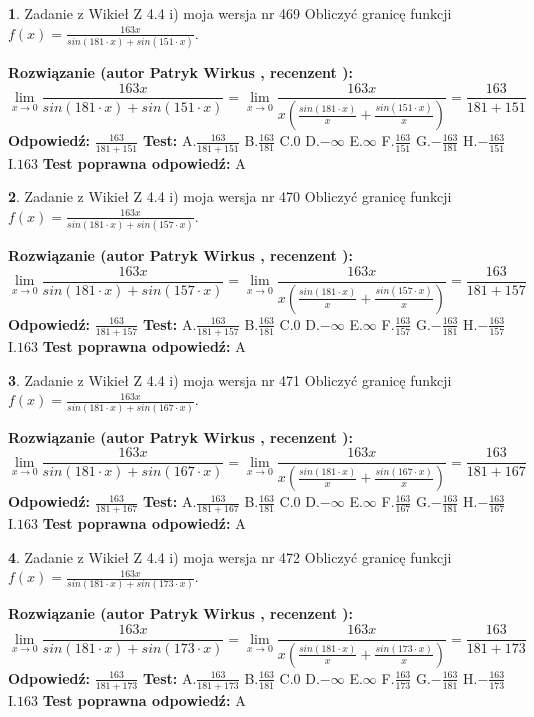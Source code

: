 \documentclass[12pt, a4paper]{article}
\theoremstyle{definition} %
\newtheorem{zad}{}
\newcommand{\zadStart}[1]{\begin{zad}#1\newline}
\newcommand{\zadStop}{\end{zad}}
\newcommand{\rozwStart}[2]{\noindent \textbf{Rozwiązanie (autor #1 , recenzent #2): }\newline}
\newcommand{\rozwStop}{\newline}
\newcommand{\odpStart}{\noindent \textbf{Odpowiedź:}\newline}
\newcommand{\odpStop}{\newline}
\newcommand{\testStart}{\noindent \textbf{Test:}\newline}
\newcommand{\testStop}{\newline}
\newcommand{\kluczStart}{\noindent \textbf{Test poprawna odpowiedź:}\newline}
\newcommand{\kluczStop}{\newline}
\begin{document}
\zadStart{Zadanie z Wikieł Z 4.4 i) moja wersja nr 469}
Obliczyć granicę funkcji $f(x)=\frac{163x}{sin(181\cdot x) +sin(151\cdot x)}$.
\zadStop
\rozwStart{Patryk Wirkus}{}
$$\lim\limits_{x\to 0}\frac{163x}{sin(181\cdot x) +sin(151\cdot x)}=\lim\limits_{x\to 0}\frac{163x}{x(\frac{sin(181\cdot x)}{x}+\frac{sin(151\cdot x)}{x})}=\frac{163}{181+151}$$
\rozwStop
\odpStart
$\frac{163}{181+151}$
\odpStop
\testStart
A.$\frac{163}{181+151}$
B.$\frac{163}{181}$
C.$0$
D.$-\infty$
E.$\infty$
F.$\frac{163}{151}$
G.$-\frac{163}{181}$
H.$-\frac{163}{151}$
I.$163$
\testStop
\kluczStart
A
\kluczStop



\zadStart{Zadanie z Wikieł Z 4.4 i) moja wersja nr 470}
Obliczyć granicę funkcji $f(x)=\frac{163x}{sin(181\cdot x) +sin(157\cdot x)}$.
\zadStop
\rozwStart{Patryk Wirkus}{}
$$\lim\limits_{x\to 0}\frac{163x}{sin(181\cdot x) +sin(157\cdot x)}=\lim\limits_{x\to 0}\frac{163x}{x(\frac{sin(181\cdot x)}{x}+\frac{sin(157\cdot x)}{x})}=\frac{163}{181+157}$$
\rozwStop
\odpStart
$\frac{163}{181+157}$
\odpStop
\testStart
A.$\frac{163}{181+157}$
B.$\frac{163}{181}$
C.$0$
D.$-\infty$
E.$\infty$
F.$\frac{163}{157}$
G.$-\frac{163}{181}$
H.$-\frac{163}{157}$
I.$163$
\testStop
\kluczStart
A
\kluczStop



\zadStart{Zadanie z Wikieł Z 4.4 i) moja wersja nr 471}
Obliczyć granicę funkcji $f(x)=\frac{163x}{sin(181\cdot x) +sin(167\cdot x)}$.
\zadStop
\rozwStart{Patryk Wirkus}{}
$$\lim\limits_{x\to 0}\frac{163x}{sin(181\cdot x) +sin(167\cdot x)}=\lim\limits_{x\to 0}\frac{163x}{x(\frac{sin(181\cdot x)}{x}+\frac{sin(167\cdot x)}{x})}=\frac{163}{181+167}$$
\rozwStop
\odpStart
$\frac{163}{181+167}$
\odpStop
\testStart
A.$\frac{163}{181+167}$
B.$\frac{163}{181}$
C.$0$
D.$-\infty$
E.$\infty$
F.$\frac{163}{167}$
G.$-\frac{163}{181}$
H.$-\frac{163}{167}$
I.$163$
\testStop
\kluczStart
A
\kluczStop



\zadStart{Zadanie z Wikieł Z 4.4 i) moja wersja nr 472}
Obliczyć granicę funkcji $f(x)=\frac{163x}{sin(181\cdot x) +sin(173\cdot x)}$.
\zadStop
\rozwStart{Patryk Wirkus}{}
$$\lim\limits_{x\to 0}\frac{163x}{sin(181\cdot x) +sin(173\cdot x)}=\lim\limits_{x\to 0}\frac{163x}{x(\frac{sin(181\cdot x)}{x}+\frac{sin(173\cdot x)}{x})}=\frac{163}{181+173}$$
\rozwStop
\odpStart
$\frac{163}{181+173}$
\odpStop
\testStart
A.$\frac{163}{181+173}$
B.$\frac{163}{181}$
C.$0$
D.$-\infty$
E.$\infty$
F.$\frac{163}{173}$
G.$-\frac{163}{181}$
H.$-\frac{163}{173}$
I.$163$
\testStop
\kluczStart
A
\kluczStop
\end{document}
